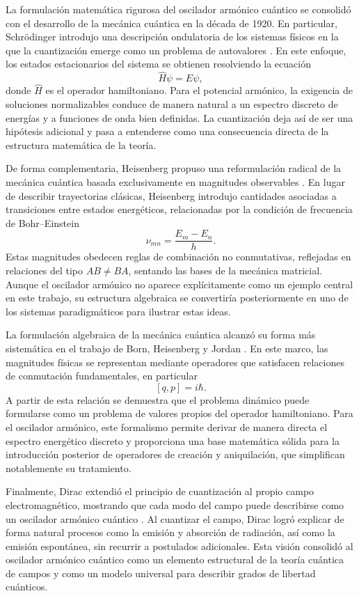 \documentclass[11pt,a4paper,spanish]{book}
\begin{document}
La formulación matemática rigurosa del oscilador armónico cuántico se consolidó con el desarrollo de la mecánica cuántica en la década de 1920. En particular, Schrödinger introdujo una descripción ondulatoria de los sistemas físicos en la que la cuantización emerge como un problema de autovalores \citep{schrodinger1926a, schrodinger1926b}. En este enfoque, los estados estacionarios del sistema se obtienen resolviendo la ecuación
\[
\hat{H}\psi = E\psi,
\]
donde $\hat{H}$ es el operador hamiltoniano. Para el potencial armónico, la exigencia de soluciones normalizables conduce de manera natural a un espectro discreto de energías y a funciones de onda bien definidas. La cuantización deja así de ser una hipótesis adicional y pasa a entenderse como una consecuencia directa de la estructura matemática de la teoría.

De forma complementaria, Heisenberg propuso una reformulación radical de la mecánica cuántica basada exclusivamente en magnitudes observables \citep{heisenberg1925}. En lugar de describir trayectorias clásicas, Heisenberg introdujo cantidades asociadas a transiciones entre estados energéticos, relacionadas por la condición de frecuencia de Bohr–Einstein
\[
\nu_{mn} = \frac{E_m - E_n}{h}.
\]
Estas magnitudes obedecen reglas de combinación no conmutativas, reflejadas en relaciones del tipo $AB \neq BA$, sentando las bases de la mecánica matricial. Aunque el oscilador armónico no aparece explícitamente como un ejemplo central en este trabajo, su estructura algebraica se convertiría posteriormente en uno de los sistemas paradigmáticos para ilustrar estas ideas.

La formulación algebraica de la mecánica cuántica alcanzó su forma más sistemática en el trabajo de Born, Heisenberg y Jordan \citep{bornheisenberg1926}. En este marco, las magnitudes físicas se representan mediante operadores que satisfacen relaciones de conmutación fundamentales, en particular
\[
[q,p] = i\hbar.
\]
A partir de esta relación se demuestra que el problema dinámico puede formularse como un problema de valores propios del operador hamiltoniano. Para el oscilador armónico, este formalismo permite derivar de manera directa el espectro energético discreto y proporciona una base matemática sólida para la introducción posterior de operadores de creación y aniquilación, que simplifican notablemente su tratamiento.

Finalmente, Dirac extendió el principio de cuantización al propio campo electromagnético, mostrando que cada modo del campo puede describirse como un oscilador armónico cuántico \citep{dirac1927}. Al cuantizar el campo, Dirac logró explicar de forma natural procesos como la emisión y absorción de radiación, así como la emisión espontánea, sin recurrir a postulados adicionales. Esta visión consolidó al oscilador armónico cuántico como un elemento estructural de la teoría cuántica de campos y como un modelo universal para describir grados de libertad cuánticos.
\end{document}
